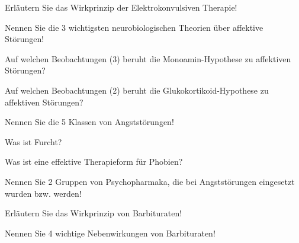 \documentclass[10pt, a4paper]{exam}
\begin{document}
\begin{questions}
\begin{solution}
  \end{solution}

  \question Erläutern Sie das Wirkprinzip der Elektrokonvulsiven Therapie!
  \begin{solution}

  \end{solution}

  \question Nennen Sie die 3 wichtigsten neurobiologischen Theorien über affektive Störungen!
  \begin{solution}

  \end{solution}

  \question Auf welchen Beobachtungen (3) beruht die Monoamin-Hypothese zu affektiven Störungen?
  \begin{solution}

  \end{solution}

  \question Auf welchen Beobachtungen (2) beruht die Glukokortikoid-Hypothese zu affektiven Störungen?
  \begin{solution}

  \end{solution}

  \question Nennen Sie die 5 Klassen von Angststörungen!
  \begin{solution}

  \end{solution}

  \question Was ist Furcht?
  \begin{solution}

  \end{solution}

  \question Was ist eine effektive Therapieform für Phobien?
  \begin{solution}

  \end{solution}

  \question Nennen Sie 2 Gruppen von Psychopharmaka, die bei Angststörungen eingesetzt wurden bzw. werden!
  \begin{solution}

  \end{solution}

  \question Erläutern Sie das Wirkprinzip von Barbituraten!
  \begin{solution}

  \end{solution}

  \question Nennen Sie 4 wichtige Nebenwirkungen von Barbituraten!
  \begin{solution}


\end{solution}
\end{questions}
\end{document}
